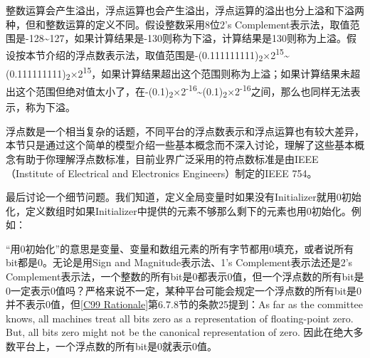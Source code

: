 整数运算会产生溢出，浮点运算也会产生溢出，浮点运算的溢出也分上溢和下溢两种，但和整数运算的定义不同。假设整数采用8位2's Complement表示法，取值范围是-128\textasciitilde{}\BookSplit{}127，如果计算结果是-130则称为下溢，计算结果是130则称为上溢。假设按本节介绍的浮点数表示法，取值范围是-(0.\BookSplit{}111111111)\textsubscript{2}×2\textsuperscript{15}\textasciitilde{}(0.\BookSplit{}111111111)\textsubscript{2}×2\textsuperscript{15}，如果计算结果超出这个范围则称为上溢；如果计算结果未超出这个范围但绝对值太小了，在-(0.\BookSplit{}1)\textsubscript{2}×2\textsuperscript{-16}\textasciitilde{}(0.\BookSplit{}1)\textsubscript{2}×2\textsuperscript{-16}之间，那么也同样无法表示，称为下溢。



浮点数是一个相当复杂的话题，不同平台的浮点数表示和浮点运算也有较大差异，本节只是通过这个简单的模型介绍一些基本概念而不深入讨论，理解了这些基本概念有助于你理解浮点数标准，目前业界广泛采用的符点数标准是由IEEE（Institute of Electrical and Electronics Engineers）制定的IEEE 754。



最后讨论一个细节问题。我们知道，定义全局变量时如果没有Initializer就用0初始化，定义数组时如果Initializer中提供的元素不够那么剩下的元素也用0初始化。例如：




“用0初始化”的意思是变量、变量和数组元素的所有字节都用0填充，或者说所有bit都是0。无论是用Sign and Magnitude表示法、1's Complement表示法还是2's Complement表示法，一个整数的所有bit是0都表示0值，但一个浮点数的所有bit是0一定表示0值吗？严格来说不一定，某种平台可能会规定一个浮点数的所有bit是0并不表示0值，但\hyperlink{db.bi01.bibli.rationale}{[C99 Rationale]}第6.\BookSplit{}7.\BookSplit{}8节的条款25提到：As far as the committee knows, all machines treat all bits zero as a representation of floating-point zero.\BookSplit{} But, all bits zero might not be the canonical representation of zero.\BookSplit{} 因此在绝大多数平台上，一个浮点数的所有bit是0就表示0值。

